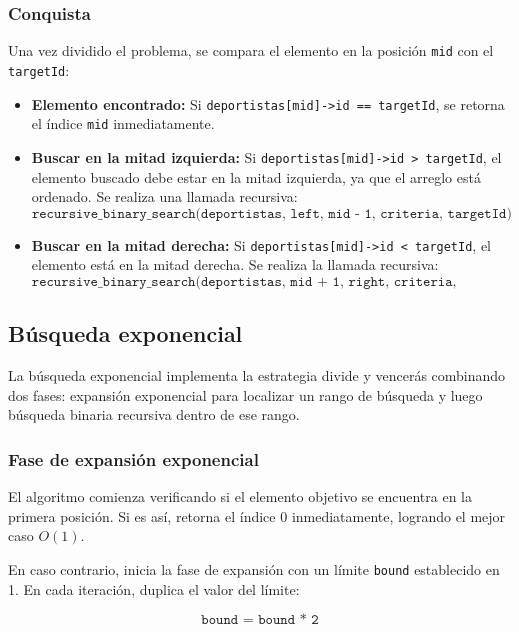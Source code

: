 \subsubsection{Conquista}
Una vez dividido el problema, se compara el elemento en la posición \texttt{mid} con el \texttt{targetId}:

\begin{itemize}
    \item \textbf{Elemento encontrado:} Si \texttt{deportistas[mid]->id == targetId}, se retorna el índice \texttt{mid} inmediatamente.
    
    \item \textbf{Buscar en la mitad izquierda:} Si \texttt{deportistas[mid]->id > targetId}, el elemento buscado debe estar en la mitad izquierda, ya que el arreglo está ordenado. Se realiza una llamada recursiva:
    \[
    \texttt{recursive\_binary\_search(deportistas, left, mid - 1, criteria, targetId)}
    \]
    
    \item \textbf{Buscar en la mitad derecha:} Si \texttt{deportistas[mid]->id < targetId}, el elemento está en la mitad derecha. Se realiza la llamada recursiva:
    \[
    \texttt{recursive\_binary\_search(deportistas, mid + 1, right, criteria, targetId)}
    \]
\end{itemize}

\subsection{Búsqueda exponencial}

La búsqueda exponencial implementa la estrategia divide y vencerás combinando dos fases: expansión exponencial para localizar un rango de búsqueda y luego búsqueda binaria recursiva dentro de ese rango.

\subsubsection{Fase de expansión exponencial}

El algoritmo comienza verificando si el elemento objetivo se encuentra en la primera posición. Si es así, retorna el índice 0 inmediatamente, logrando el mejor caso \(O(1)\).

En caso contrario, inicia la fase de expansión con un límite \texttt{bound} establecido en 1. En cada iteración, duplica el valor del límite:

\[
\texttt{bound = bound * 2}
\]


